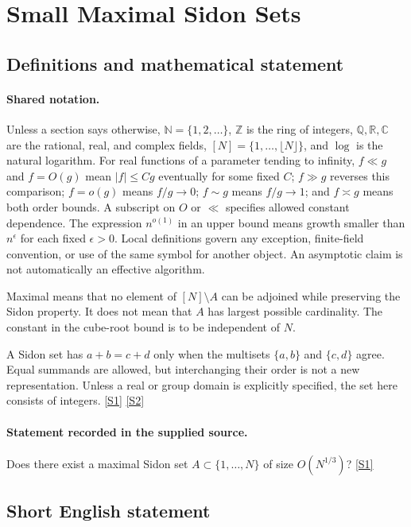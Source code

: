 \documentclass[11pt,a4paper]{article}
\newcommand{\N}{\mathbb{N}}
\newcommand{\Z}{\mathbb{Z}}
\newcommand{\Q}{\mathbb{Q}}
\newcommand{\R}{\mathbb{R}}
\newcommand{\C}{\mathbb{C}}
\newcommand{\sref}[2]{\hyperlink{source:#1:#2}{[S#2]}}
\begin{document}
\section{Small Maximal Sidon Sets}\label{statement}


\subsection{Definitions and mathematical statement}

\paragraph{Shared notation.}Unless a section says otherwise, $\N=\{1,2,\ldots\}$,
$\Z$ is the ring of integers, $\Q,\R,\C$ are the rational, real, and complex
fields, $[N]=\{1,\ldots,\lfloor N\rfloor\}$, and $\log$ is the natural
logarithm. For real functions of a parameter tending to infinity,
$f\ll g$ and $f=O(g)$ mean $|f|\leq Cg$ eventually for some fixed $C$;
$f\gg g$ reverses this comparison; $f=o(g)$ means $f/g\to0$;
$f\sim g$ means $f/g\to1$; and $f\asymp g$ means both order bounds.
A subscript on $O$ or $\ll$ specifies allowed constant dependence.
The expression $n^{o(1)}$ in an upper bound means growth smaller than
$n^\epsilon$ for each fixed $\epsilon>0$. Local definitions govern any
exception, finite-field convention, or use of the same symbol for another
object. An asymptotic claim is not automatically an effective algorithm.



Maximal means that no element of $[N]\setminus A$ can be adjoined while preserving the Sidon property. It does not mean that $A$ has largest possible cardinality. The constant in the cube-root bound is to be independent of $N$.

A Sidon set has $a+b=c+d$ only when the multisets $\{a,b\}$ and $\{c,d\}$ agree. Equal summands are allowed, but interchanging their order is not a new representation. Unless a real or group domain is explicitly specified, the set here consists of integers. \sref{statement}{1} \sref{statement}{2}

\paragraph{Statement recorded in the supplied source.}
Does there exist a maximal Sidon set $A\subset \{1,\ldots,N\}$ of size $O(N^{1/3})$? \sref{statement}{1}

\subsection{Short English statement}
\end{document}
